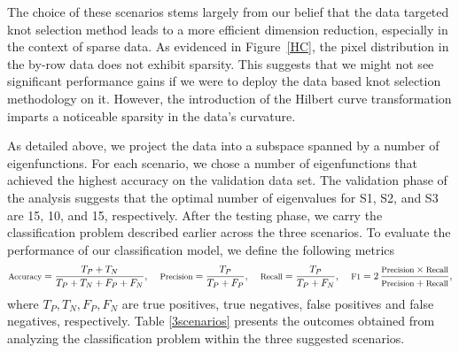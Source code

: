 The choice of these scenarios stems largely from our belief that the data targeted knot selection method leads to a more efficient dimension reduction, especially in the context of sparse data. As evidenced in Figure~\ref{HC}, the pixel distribution in the by-row data does not exhibit sparsity. This suggests that we might not see significant performance gains if we were to deploy the data based knot selection methodology on it.
However, the introduction of the Hilbert curve transformation imparts a noticeable sparsity in the data's curvature. 


As detailed above, we project the data into a subspace spanned by a number of eigenfunctions. For each scenario, we chose a number of eigenfunctions that achieved the highest accuracy on the validation data set. The validation phase of the analysis suggests that the optimal number of eigenvalues for S1, S2, and S3 are 15, 10, and 15, respectively. After the testing phase, we carry the classification problem described earlier across the three scenarios.
To evaluate the performance of our classification model, we define the following metrics
\begin{equation*}\footnotesize
        \text{Accuracy} = \frac{T_P + T_N}{T_P + T_N + F_P + F_N}, \ \ \ \  \text{Precision} = \frac{T_P}{T_P + F_P}, \ \ \ \  \text{Recall} = \frac{T_P}{T_P + F_N}, \ \ \ \ \text{F1} = 2 \, \frac{\text{Precision} \times \text{Recall}}{\text{Precision} + \text{Recall}},
        \end{equation*}
        where $T_P, T_N, F_P, F_N$ are true positives, true negatives, false positives and false negatives, respectively. 
Table \ref{3scenarios} presents the outcomes obtained from analyzing the classification problem within the three suggested scenarios.




